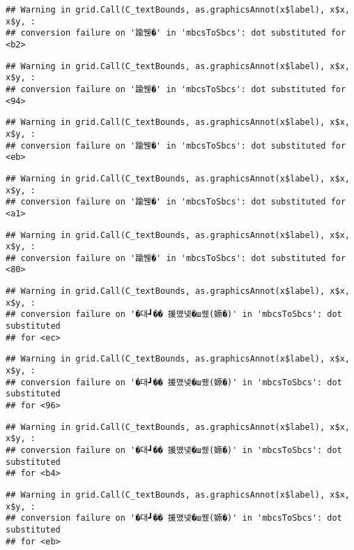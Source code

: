 \documentclass[
]{article}
\begin{document}
\begin{verbatim}
## Warning in grid.Call(C_textBounds, as.graphicsAnnot(x$label), x$x, x$y, :
## conversion failure on '踰붾�' in 'mbcsToSbcs': dot substituted for <b2>
\end{verbatim}

\begin{verbatim}
## Warning in grid.Call(C_textBounds, as.graphicsAnnot(x$label), x$x, x$y, :
## conversion failure on '踰붾�' in 'mbcsToSbcs': dot substituted for <94>
\end{verbatim}

\begin{verbatim}
## Warning in grid.Call(C_textBounds, as.graphicsAnnot(x$label), x$x, x$y, :
## conversion failure on '踰붾�' in 'mbcsToSbcs': dot substituted for <eb>
\end{verbatim}

\begin{verbatim}
## Warning in grid.Call(C_textBounds, as.graphicsAnnot(x$label), x$x, x$y, :
## conversion failure on '踰붾�' in 'mbcsToSbcs': dot substituted for <a1>
\end{verbatim}

\begin{verbatim}
## Warning in grid.Call(C_textBounds, as.graphicsAnnot(x$label), x$x, x$y, :
## conversion failure on '踰붾�' in 'mbcsToSbcs': dot substituted for <80>
\end{verbatim}

\begin{verbatim}
## Warning in grid.Call(C_textBounds, as.graphicsAnnot(x$label), x$x, x$y, :
## conversion failure on '�대┛�� 援먰넻�ш퀬(嫄�)' in 'mbcsToSbcs': dot substituted
## for <ec>
\end{verbatim}

\begin{verbatim}
## Warning in grid.Call(C_textBounds, as.graphicsAnnot(x$label), x$x, x$y, :
## conversion failure on '�대┛�� 援먰넻�ш퀬(嫄�)' in 'mbcsToSbcs': dot substituted
## for <96>
\end{verbatim}

\begin{verbatim}
## Warning in grid.Call(C_textBounds, as.graphicsAnnot(x$label), x$x, x$y, :
## conversion failure on '�대┛�� 援먰넻�ш퀬(嫄�)' in 'mbcsToSbcs': dot substituted
## for <b4>
\end{verbatim}

\begin{verbatim}
## Warning in grid.Call(C_textBounds, as.graphicsAnnot(x$label), x$x, x$y, :
## conversion failure on '�대┛�� 援먰넻�ш퀬(嫄�)' in 'mbcsToSbcs': dot substituted
## for <eb>
\end{verbatim}
\end{document}
